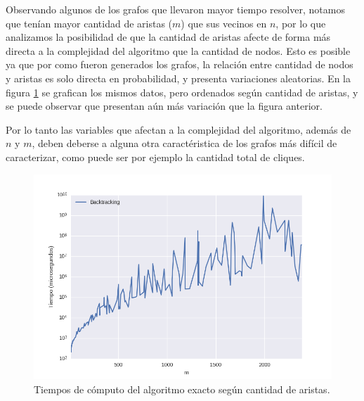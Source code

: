 Observando algunos de los grafos que llevaron mayor tiempo resolver, notamos que tenían mayor cantidad de aristas ($m$) que sus vecinos en $n$, por lo que analizamos la posibilidad de que la cantidad de aristas afecte de forma más directa a la complejidad del algoritmo que la cantidad de nodos. Esto es posible ya que por como fueron generados los grafos, la relación entre cantidad de nodos y aristas es solo directa en probabilidad, y presenta variaciones aleatorias. En la figura \ref{backtrackingM} se grafican los mismos datos, pero ordenados según cantidad de aristas, y se puede observar que presentan aún más variación que la figura anterior. 

Por lo tanto las variables que afectan a la complejidad del algoritmo, además de $n$ y $m$, deben deberse a alguna otra caractéristica de los grafos más difícil de caracterizar, como puede ser por ejemplo la cantidad total de cliques.

\begin{figure}[h!]
	\centering
		\includegraphics[scale=0.6]{Imagenes/Tiempos150mlogy.png}
		\caption{\small{Tiempos de cómputo del algoritmo exacto según cantidad de aristas.}}
        \label{backtrackingM}
\end{figure}